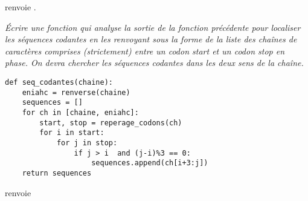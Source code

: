  renvoie \type{([1], [7, 10, 17])}.
\begin{Exercise}\it 
Écrire une fonction  qui analyse la sortie de la fonction précédente pour localiser les séquences codantes en les renvoyant sous la forme de la liste des chaînes de caractères comprises (strictement) entre un codon {\sc start} et un codon {\sc stop} en phase. On devra chercher les séquences codantes dans les deux sens de la chaîne.
\end{Exercise}
\begin{Answer}
\begin{lstlisting}
def seq_codantes(chaine):
    eniahc = renverse(chaine)
    sequences = []
    for ch in [chaine, eniahc]:
        start, stop = reperage_codons(ch)   
        for i in start:
            for j in stop:
                if j > i  and (j-i)%3 == 0:
                    sequences.append(ch[i+3:j])
    return sequences
\end{lstlisting}
\end{Answer}
 renvoie  

\newpage

 